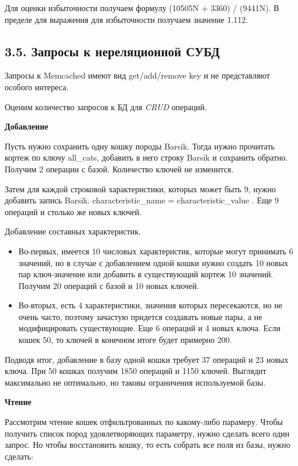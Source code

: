 Для оценки избыточности получаем формулу (10505N + 3360) / (9441N). В пределе для выражения для избыточности получаем
значение 1.112.

\subsection*{3.5. Запросы к нереляционной СУБД}
Запросы к Memcached имеют вид {get/add/remove} key и не представляют особого интереса.

Оценим количество запросов к БД для \textit{CRUD} операций.

\textbf{Добавление}

Пусть нужно сохранить одну кошку породы Barsik. Тогда нужно прочитать кортеж по ключу all\_cats, добавить в него
строку Barsik и сохранить обратно. Получим 2 операции с базой. Количество ключей не изменится.

Затем для каждой строковой характеристики, которых может быть 9, нужно добавить
запись Barsik.{ characteristic\_name } = { characteristic\_value }. Еще 9 операций и столько же новых ключей.

Добавление составных характеристик.
\begin{itemize}
    \item Во-первых, имеется 10 числовых характеристик, которые могут принимать 6 значений, но в случае с добавлением одной
  кошки нужно создать 10 новых пар ключ-значение или добавить в существующий кортеж 10 значений. Получим 20 операций с
  базой и 10 новых ключей.
    \item Во-вторых, есть 4 характеристики, значения которых пересекаются, но не очень часто, поэтому зачастую придется
  создавать новые пары, а не модифицировать существующие. Еще 6 операций и 4 новых ключа. Если кошек 50, то ключей в
  конечном итоге будет примерно 200.
\end{itemize}

Подводя итог, добавление в базу одной кошки требует 37 операций и 23 новых ключа. При 50 кошках получим 1850 операций и
1150 ключей. Выглядит максимально не оптимально, но таковы ограничения используемой базы.

\textbf{Чтение}

Рассмотрим чтение кошек отфильтрованных по какому-либо парамеру. Чтобы получить список пород удовлетворяющих параметру,
нужно сделать всего один запрос. Но чтобы восстановить кошку, то есть собрать все поля из базы, нужно сделать:

